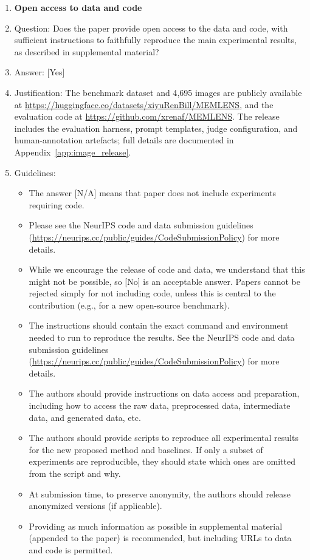 \documentclass{llmxive}
\providecommand{\answerYes}[1][]{[Yes]#1}
\providecommand{\answerNo}[1][]{[No]#1}
\providecommand{\answerNA}[1][]{[N/A]#1}
\begin{document}
\begin{enumerate}
\item {\bf Open access to data and code}
    \item[] Question: Does the paper provide open access to the data and code, with sufficient instructions to faithfully reproduce the main experimental results, as described in supplemental material?
    \item[] Answer: \answerYes{}
    \item[] Justification: The benchmark dataset and 4{,}695 images are publicly available at \url{https://huggingface.co/datasets/xiyuRenBill/MEMLENS}, and the evaluation code at \url{https://github.com/xrenaf/MEMLENS}. The release includes the evaluation harness, prompt templates, judge configuration, and human-annotation artefacts; full details are documented in Appendix~\ref{app:image_release}.
    \item[] Guidelines:
    \begin{itemize}
        \item The answer \answerNA{} means that paper does not include experiments requiring code.
        \item Please see the NeurIPS code and data submission guidelines (\url{https://neurips.cc/public/guides/CodeSubmissionPolicy}) for more details.
        \item While we encourage the release of code and data, we understand that this might not be possible, so \answerNo{} is an acceptable answer. Papers cannot be rejected simply for not including code, unless this is central to the contribution (e.g., for a new open-source benchmark).
        \item The instructions should contain the exact command and environment needed to run to reproduce the results. See the NeurIPS code and data submission guidelines (\url{https://neurips.cc/public/guides/CodeSubmissionPolicy}) for more details.
        \item The authors should provide instructions on data access and preparation, including how to access the raw data, preprocessed data, intermediate data, and generated data, etc.
        \item The authors should provide scripts to reproduce all experimental results for the new proposed method and baselines. If only a subset of experiments are reproducible, they should state which ones are omitted from the script and why.
        \item At submission time, to preserve anonymity, the authors should release anonymized versions (if applicable).
        \item Providing as much information as possible in supplemental material (appended to the paper) is recommended, but including URLs to data and code is permitted.
    \end{itemize}



\end{enumerate}
\end{document}
